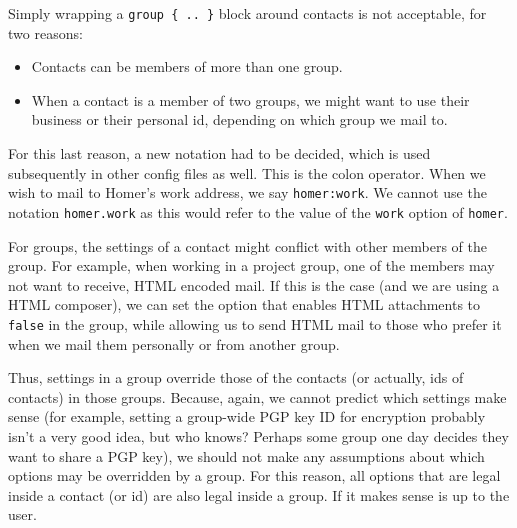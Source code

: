 \documentclass[a4paper]{article}
\begin{document}
Simply wrapping a \texttt{group \{ .. \}} block around contacts is not
acceptable, for two reasons:
\begin{itemize}
\item Contacts can be members of more than one group.
\item When a contact is a member of two groups, we might want to use
	their business or their personal id, depending on which group we
	mail to.
\end{itemize}
For this last reason, a new notation had to be decided, which is used
subsequently in other config files as well.  This is the colon
operator.  When we wish to mail to Homer's work address, we say
\texttt{homer:work}.  We cannot use the notation \texttt{homer.work} as
this would refer to the value of the \texttt{work} option of \texttt{homer}.

For groups, the settings of a contact might conflict with other members
of the group.  For example, when working in a project group, one of the
members may not want to receive, HTML encoded mail.  If this is the
case (and we are using a HTML composer), we can set the option that
enables HTML attachments to \texttt{false} in the group, while allowing
us to send HTML mail to those who prefer it when we mail them personally
or from another group.

Thus, settings in a group override those of the contacts (or actually,
ids of contacts) in those groups.  Because, again, we cannot predict
which settings make sense (for example, setting a group-wide PGP key ID for
encryption probably isn't a very good idea, but who knows?  Perhaps some
group one day decides they want to share a PGP key), we should not make any
assumptions about which options may be overridden by a group.
For this reason, all options that are legal inside a contact (or id) are
also legal inside a group.  If it makes sense is up to the user.
\end{document}
